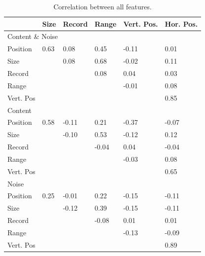 \begin{table}[h]
\centering
\caption{Correlation between all features.}
\label{tab:featcorr}
\begin{tabular}{ | l | l | l | l | l | l |}
\hline
& Size & Record & Range & Vert. Pos. & Hor. Pos. \\ \hline
\multicolumn{6}{|l|}{Content \& Noise} \\
\hline
Position & 0.63 & 0.08 & 0.45 & -0.11 & 0.01 \\
Size & & 0.08 & 0.68 & -0.02 & 0.11 \\
Record & & & 0.08 & 0.04 & 0.03 \\
Range & & & & -0.01 & 0.08 \\
Vert. Pos & & & & & 0.85 \\
\hline
\multicolumn{6}{|l|}{Content} \\
\hline
Position & 0.58 & -0.11 & 0.21 & -0.37 & -0.07 \\
Size & & -0.10 & 0.53 & -0.12 & 0.12 \\
Record & & & -0.04 & 0.04 & -0.04 \\
Range & & & & -0.03 & 0.08 \\
Vert. Pos & & & & & 0.65 \\
\hline
\multicolumn{6}{|l|}{Noise} \\
\hline
Position & 0.25 & -0.01 & 0.22 & -0.15 & -0.11 \\
Size & & -0.12 & 0.39 & -0.15 & -0.11 \\
Record & & & -0.08 & 0.01 & 0.01 \\
Range & & & & -0.13 & -0.09 \\
Vert. Pos & & & & & 0.89 \\
\hline
\end{tabular}
\end{table}

